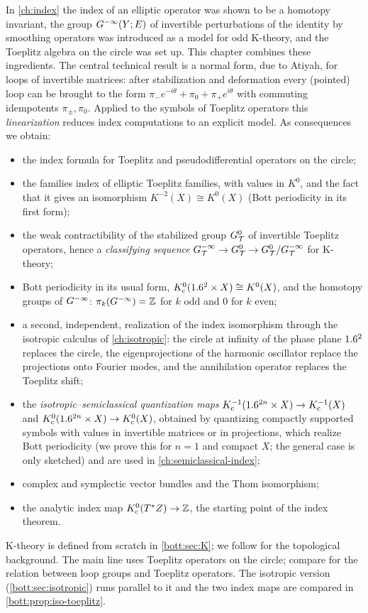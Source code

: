 In \cref{ch:index} the index of an elliptic operator was shown to be a
homotopy invariant, the group $G^{-\infty}(Y;E)$ of invertible perturbations of the
identity by smoothing operators was introduced as a model for odd K-theory, and
the Toeplitz algebra on the circle was set up. This chapter combines these
ingredients. The central technical result is a normal form, due to Atiyah, for
loops of invertible matrices: after stabilization and deformation every
(pointed) loop can be brought to the form
$\pi_-e^{-i\theta}+\pi_0+\pi_+e^{i\theta}$ with commuting idempotents
$\pi_\pm,\pi_0$. Applied to the symbols of Toeplitz operators this
\emph{linearization} reduces index computations to an explicit model.
As consequences we obtain:
\begin{itemize}
\item the index formula for Toeplitz and pseudodifferential operators on the circle;
\item the families index of elliptic Toeplitz families, with values in $K^0$, and the
  fact that it gives an isomorphism $K^{-2}(X)\cong K^0(X)$ (Bott periodicity in its
  first form);
\item the weak contractibility of the stabilized group $G^{0}_{\mathcal{T}}$ of invertible Toeplitz
  operators, hence a \emph{classifying sequence}
  $G^{-\infty}_{\mathcal{T}}\to G^{0}_{\mathcal{T}}\to G^{0}_{\mathcal{T}}/G^{-\infty}_{\mathcal{T}}$ for K-theory;
\item Bott periodicity in its usual form, $K_{\mathrm{c}}^0(1.6^2\times X)\cong K^0(X)$, and the
  homotopy groups of $G^{-\infty}$: $\pi_k(G^{-\infty})=\mathbb{Z}$ for $k$ odd and $0$ for $k$ even;
\item a second, independent, realization of the index isomorphism through the
  isotropic calculus of \cref{ch:isotropic}: the circle at infinity of the phase
  plane $1.6^2$ replaces the circle, the eigenprojections of the harmonic oscillator
  replace the projections onto Fourier modes, and the annihilation operator replaces
  the Toeplitz shift;
\item the \emph{isotropic--semiclassical quantization maps}
  $K_{\mathrm{c}}^{-1}(1.6^{2n}\times X)\to K_{\mathrm{c}}^{-1}(X)$ and $K_{\mathrm{c}}^0(1.6^{2n}\times X)\to K_{\mathrm{c}}^0(X)$,
  obtained by quantizing compactly supported symbols with values in invertible
  matrices or in projections, which realize Bott periodicity (we prove this for $n=1$
  and compact $X$; the general case is only sketched) and are used in
  \cref{ch:semiclassical-index};
\item complex and symplectic vector bundles and the Thom isomorphism;
\item the analytic index map $K_{\mathrm{c}}^0(T^*Z)\to\mathbb{Z}$, the starting point of the index
  theorem.
\end{itemize}
K-theory is defined from scratch in \cref{bott:sec:K}; we follow
\cite{Atiyah-K} for the topological background. The main line uses Toeplitz operators
on the circle; compare \cite{Pressley-Segal} for the relation between loop groups and
Toeplitz operators. The isotropic version (\cref{bott:sec:isotropic}) runs parallel to
it and the two index maps are compared in \cref{bott:prop:iso-toeplitz}.

